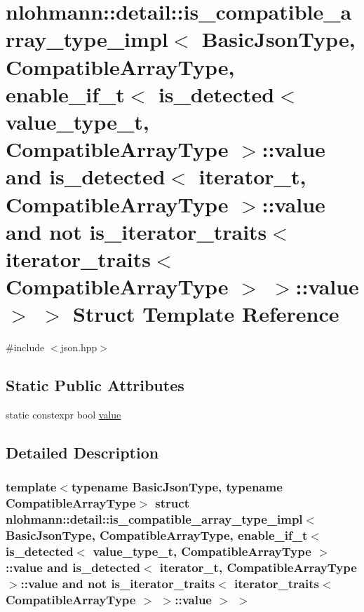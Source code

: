 \hypertarget{structnlohmann_1_1detail_1_1is__compatible__array__type__impl_3_01_basic_json_type_00_01_compati04c4671a9fa75002365be1949a74f972}{}\section{nlohmann\+::detail\+::is\+\_\+compatible\+\_\+array\+\_\+type\+\_\+impl$<$ Basic\+Json\+Type, Compatible\+Array\+Type, enable\+\_\+if\+\_\+t$<$ is\+\_\+detected$<$ value\+\_\+type\+\_\+t, Compatible\+Array\+Type $>$\+::value and is\+\_\+detected$<$ iterator\+\_\+t, Compatible\+Array\+Type $>$\+::value and not is\+\_\+iterator\+\_\+traits$<$ iterator\+\_\+traits$<$ Compatible\+Array\+Type $>$ $>$\+::value $>$ $>$ Struct Template Reference}
\label{structnlohmann_1_1detail_1_1is__compatible__array__type__impl_3_01_basic_json_type_00_01_compati04c4671a9fa75002365be1949a74f972}


{\ttfamily \#include $<$json.\+hpp$>$}

\subsection*{Static Public Attributes}
\begin{DoxyCompactItemize}
\item 
static constexpr bool \mbox{\hyperlink{structnlohmann_1_1detail_1_1is__compatible__array__type__impl_3_01_basic_json_type_00_01_compati04c4671a9fa75002365be1949a74f972_aa9bdf31f85ac3ee17180a008f1cb81f7}{value}}
\end{DoxyCompactItemize}


\subsection{Detailed Description}
\subsubsection*{template$<$typename Basic\+Json\+Type, typename Compatible\+Array\+Type$>$\newline
struct nlohmann\+::detail\+::is\+\_\+compatible\+\_\+array\+\_\+type\+\_\+impl$<$ Basic\+Json\+Type, Compatible\+Array\+Type, enable\+\_\+if\+\_\+t$<$ is\+\_\+detected$<$ value\+\_\+type\+\_\+t, Compatible\+Array\+Type $>$\+::value and is\+\_\+detected$<$ iterator\+\_\+t, Compatible\+Array\+Type $>$\+::value and not is\+\_\+iterator\+\_\+traits$<$ iterator\+\_\+traits$<$ Compatible\+Array\+Type $>$ $>$\+::value $>$ $>$}



